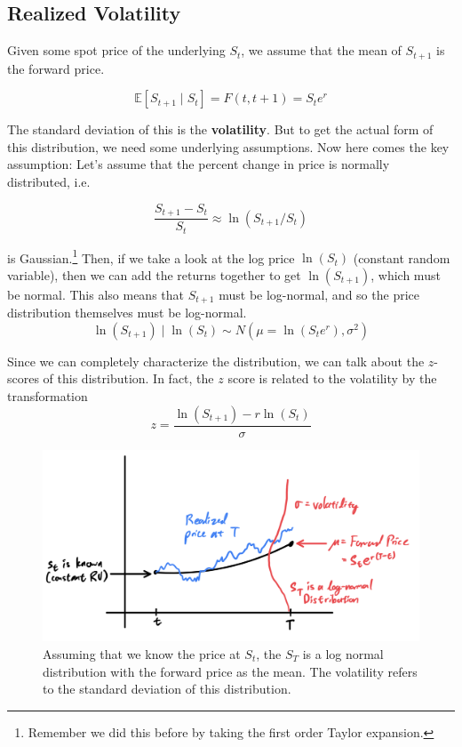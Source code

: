 \documentclass{article}
\begin{document}
  \subsection{Realized Volatility}

    Given some spot price of the underlying $S_t$, we assume that the mean of $S_{t + 1}$ is the forward price. 

    \begin{equation}
      \mathbb{E}[S_{t+1} \mid S_t] = F(t, t+1) = S_t e^{r} 
    \end{equation} 

    The standard deviation of this is the \textbf{volatility}. But to get the actual form of this distribution, we need some underlying assumptions. Now here comes the key assumption: Let's assume that the percent change in price is normally distributed, i.e. 

    \begin{equation}
      \frac{S_{t + 1} - S_t}{S_t} \approx \ln(S_{t + 1} / S_t) 
    \end{equation}

    is Gaussian.\footnote{Remember we did this before by taking the first order Taylor expansion.} Then, if we take a look at the log price $\ln(S_t)$ (constant random variable), then we can add the returns together to get $\ln(S_{t + 1})$, which must be normal. This also means that $S_{t+1}$ must be log-normal, and so the price distribution themselves must be log-normal. 
    \begin{equation}
      \ln(S_{t + 1}) \mid \ln(S_t) \sim N(\mu = \ln(S_t e^r), \sigma^2)
    \end{equation}

    Since we can completely characterize the distribution, we can talk about the $z$-scores of this distribution. In fact, the $z$ score is related to the volatility by the transformation 
    \begin{equation}
      z = \frac{\ln(S_{t + 1}) - r \ln(S_t)}{\sigma}
    \end{equation}

    \begin{figure}[H]
      \centering 
      \includegraphics[scale=0.5]{img/distribution_of_S_T.png}
      \caption{Assuming that we know the price at $S_t$, the $S_T$ is a log normal distribution with the forward price as the mean. The volatility refers to the standard deviation of this distribution. } 
      \label{fig:distribution_of_S_T}
    \end{figure}
\end{document}
